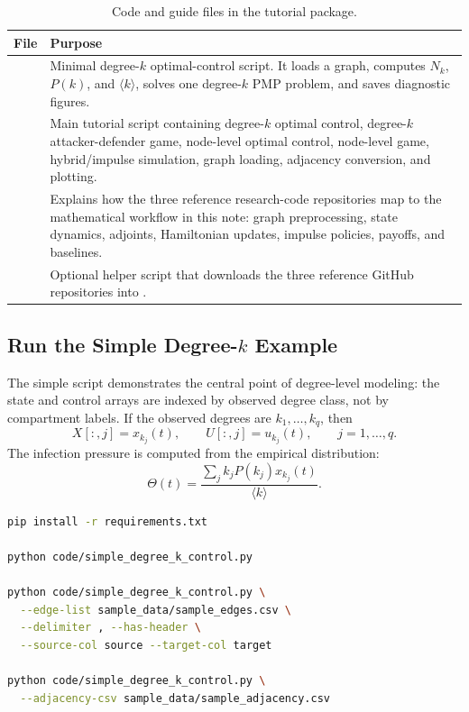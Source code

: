\documentclass[11pt,a4paper]{article}
\begin{document}
\begin{table}[h!]
\centering
\caption{Code and guide files in the tutorial package.}
\begin{tabularx}{\textwidth}{L{4.8cm}Y}
\toprule
\textbf{File} & \textbf{Purpose} \\
\midrule
{} & Minimal degree-$k$ optimal-control script. It loads a graph, computes $N_k$, $P(k)$, and $\langle k\rangle$, solves one degree-$k$ PMP problem, and saves diagnostic figures. \\
 & Main tutorial script containing degree-$k$ optimal control, degree-$k$ attacker-defender game, node-level optimal control, node-level game, hybrid/impulse simulation, graph loading, adjacency conversion, and plotting. \\
 & Explains how the three reference research-code repositories map to the mathematical workflow in this note: graph preprocessing, state dynamics, adjoints, Hamiltonian updates, impulse policies, payoffs, and baselines. \\
 & Optional helper script that downloads the three reference GitHub repositories into . \\
\bottomrule
\end{tabularx}
\end{table}

\subsection{Run the Simple Degree-$k$ Example}

The simple script demonstrates the central point of degree-level modeling: the state and control arrays are indexed by observed degree class, not by compartment labels.  If the observed degrees are $k_1,\dots,k_q$, then
\[
X[:,j]=x_{k_j}(t),\qquad U[:,j]=u_{k_j}(t),\qquad j=1,\dots,q.
\]
The infection pressure is computed from the empirical distribution:
\[
\Theta(t)=\frac{\sum_j k_j P(k_j)x_{k_j}(t)}{\langle k\rangle}.
\]

\begin{lstlisting}[language=bash,caption={Run the minimal degree-k optimal-control script.},numbers=none]
pip install -r requirements.txt

python code/simple_degree_k_control.py

python code/simple_degree_k_control.py \
  --edge-list sample_data/sample_edges.csv \
  --delimiter , --has-header \
  --source-col source --target-col target

python code/simple_degree_k_control.py \
  --adjacency-csv sample_data/sample_adjacency.csv
\end{lstlisting}
\end{document}
